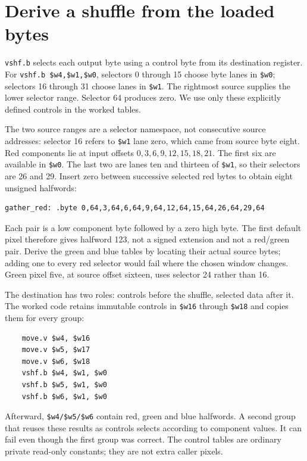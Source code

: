 \section{Derive a shuffle from the loaded bytes}

\texttt{vshf.b} selects each output byte using a control byte from its destination
register. For \texttt{vshf.b \$w4,\$w1,\$w0}, selectors 0 through 15 choose byte
lanes in \texttt{\$w0}; selectors 16 through 31 choose lanes in \texttt{\$w1}.
The rightmost source supplies the lower selector range. Selector 64 produces zero.
We use only these explicitly defined controls in the worked tables.

The two source ranges are a selector namespace, not consecutive source addresses:
selector 16 refers to \texttt{\$w1} lane zero, which came from source byte eight.
Red components lie at input offsets $0,3,6,9,12,15,18,21$. The first six are
available in \texttt{\$w0}. The last two are lanes ten and thirteen of
\texttt{\$w1}, so their selectors are 26 and 29. Insert zero between successive
selected red bytes to obtain eight unsigned halfwords:
\begin{verbatim}
gather_red: .byte 0,64,3,64,6,64,9,64,12,64,15,64,26,64,29,64
\end{verbatim}
Each pair is a low component byte followed by a zero high byte. The first default
pixel therefore gives halfword 123, not a signed extension and not a red/green
pair. Derive the green and blue tables by locating their actual source bytes;
adding one to every red selector would fail where the chosen window changes.
Green pixel five, at source offset sixteen, uses selector 24 rather than 16.



The destination has two roles: controls before the shuffle, selected data after
it. The worked code retains immutable controls in \texttt{\$w16} through
\texttt{\$w18} and copies them for every group:
\begin{verbatim}
    move.v $w4, $w16
    move.v $w5, $w17
    move.v $w6, $w18
    vshf.b $w4, $w1, $w0
    vshf.b $w5, $w1, $w0
    vshf.b $w6, $w1, $w0
\end{verbatim}
Afterward, \texttt{\$w4/\$w5/\$w6} contain red, green and blue halfwords. A second
group that reuses these results as controls selects according to component values.
It can fail even though the first group was correct. The control tables are
ordinary private read-only constants; they are not extra caller pixels.

